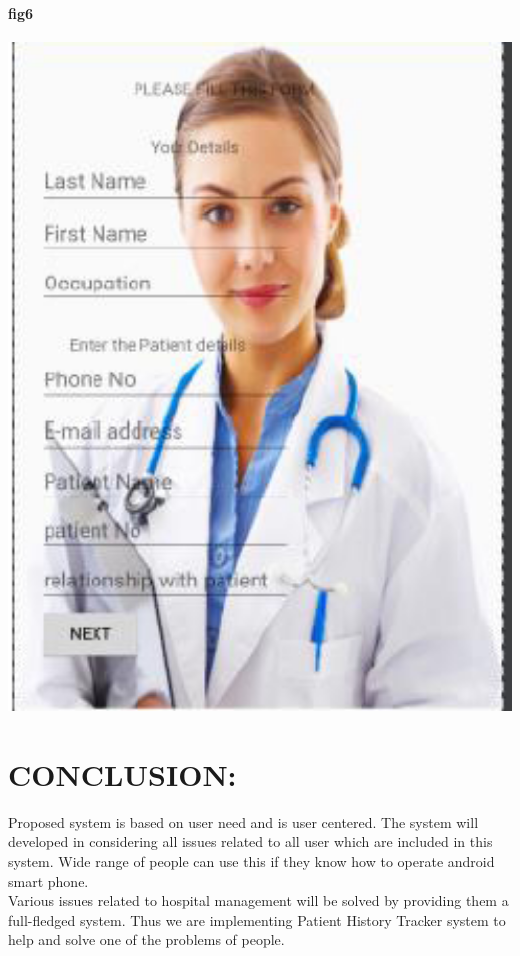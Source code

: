 \documentclass[12pt,]{article}
\begin{document}
\paragraph{fig6 }
\includegraphics[width=1.0\textwidth]{./capture6}\\[0.1in]

\section{CONCLUSION:}
Proposed system is based on user need and is user centered. The system will developed in considering all issues related to all user which are included in this system. Wide range of people can use this if they know how to operate android smart phone.\\ Various issues related to hospital management will be solved by providing them a full-fledged system. Thus we are implementing Patient History Tracker system to help and solve one of the problems of people\cite{hawkins1989patient}.



\newpage




 
\end{document}
